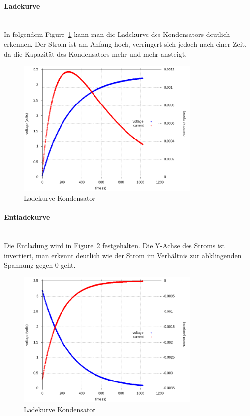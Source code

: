 \documentclass{article}
\begin{document}
\paragraph{Ladekurve}\mbox{}\\
In folgendem Figure~\ref{fig:Ladekurve} kann man die Ladekurve des Kondensators deutlich erkennen. 
Der Strom ist am Anfang hoch, verringert sich jedoch nach einer Zeit, da die Kapazität des Kondensators mehr und mehr ansteigt.
\begin{figure}[h!]
    \centering
    \includegraphics[width=0.8\textwidth]{rc_charging_curve_voltage_current.png}
    \caption{Ladekurve Kondensator}
    \label{fig:Ladekurve}
\end{figure}

\newpage
\paragraph{Entladekurve}\mbox{}\\
Die Entladung wird in Figure~\ref{fig:Entladekurve} festgehalten. 
Die Y-Achse des Stroms ist invertiert, man erkennt deutlich wie der Strom im Verhältnis zur abklingenden Spannung gegen 0 geht.

\begin{figure}[h!]
    \centering
    \includegraphics[width=0.8\textwidth]{rc_discharging_curve_voltage_current.png}
    \caption{Ladekurve Kondensator}
    \label{fig:Entladekurve}
\end{figure}
\end{document}
